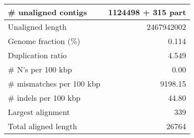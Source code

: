\documentclass[12pt,a4paper]{article}
\begin{document}
\begin{table}[ht]
\begin{center}
\begin{tabular}{|l*{1}{|r}|}
\# unaligned contigs & 1124498 + 315 part \\ \hline
Unaligned length & 2467942002 \\ \hline
Genome fraction (\%) & 0.114 \\ \hline
Duplication ratio & 4.549 \\ \hline
\# N's per 100 kbp & 0.00 \\ \hline
\# mismatches per 100 kbp & 9198.15 \\ \hline
\# indels per 100 kbp & 44.80 \\ \hline
Largest alignment & 339 \\ \hline
Total aligned length & 26764 \\ \hline
\end{tabular}
\end{center}
\end{table}
\end{document}
